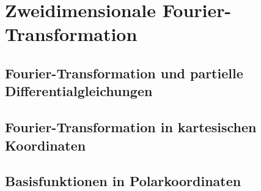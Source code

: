 %
%
%
\section{Zweidimensionale Fourier-Transformation
\label{buch:fourier:section:2d}}

\subsection{Fourier-Transformation und partielle Differentialgleichungen}

\subsection{Fourier-Transformation in kartesischen Koordinaten}

\subsection{Basisfunktionen in Polarkoordinaten}





